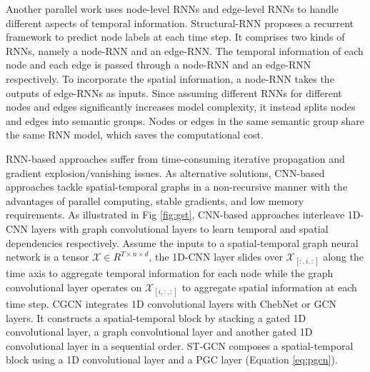 Another parallel work uses node-level RNNs and edge-level RNNs to handle different aspects of temporal information. Structural-RNN \cite{jain2016structural} proposes a recurrent framework to predict node labels at each time step. It comprises two kinds of RNNs, namely a node-RNN and an edge-RNN. The temporal information of each node and each edge is passed through a node-RNN and an edge-RNN respectively. To incorporate the spatial information, a node-RNN takes the outputs of edge-RNNs as inputs. Since assuming different RNNs for different nodes and edges significantly increases model complexity, it instead splits nodes and edges into semantic groups. 
Nodes or edges in the same semantic group share the same RNN model, which saves the computational cost. %
	
	
RNN-based approaches suffer from time-consuming iterative propagation and gradient explosion/vanishing issues. As alternative solutions, CNN-based approaches tackle spatial-temporal graphs in a non-recursive manner with the advantages of parallel computing, stable gradients, and low memory requirements. As illustrated in Fig \ref{fig:gst}, CNN-based approaches interleave 1D-CNN layers with graph convolutional layers to learn temporal and spatial dependencies respectively. Assume the inputs to a spatial-temporal graph neural network is a tensor $\mathbf{\mathcal{X}}\in R^{T\times n\times d}$, the 1D-CNN layer slides over $\mathbf{\mathcal{X}}_{[:,i,:]}$ along the time axis to aggregate temporal information for each node while the graph convolutional layer operates on $\mathbf{\mathcal{X}}_{[i,:,:]}$ to aggregate spatial information at each time step.  CGCN \cite{yuspatio} integrates 1D convolutional layers with ChebNet \cite{defferrard2016convolutional} or GCN \cite{kipf2017semi} layers. It constructs a spatial-temporal block by stacking a gated 1D convolutional layer, a graph convolutional layer and another gated 1D convolutional layer in a sequential order. ST-GCN \cite{yan2018spatial} composes a spatial-temporal block using a 1D convolutional layer and a PGC layer (Equation \ref{eq:pgcn}). 

